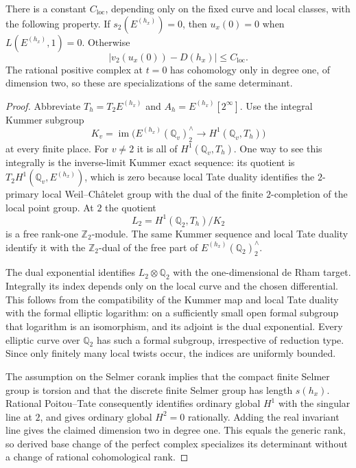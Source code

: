 \begin{proposition}\label{cy:central}
There is a constant $C_{\mathrm{loc}}$, depending only on the fixed curve
and local classes, with the following property.  If $s_2(E^{(h_x)})=0$,
then $u_x(0)=0$ when $L(E^{(h_x)},1)=0$.  Otherwise
\begin{equation}\label{cy:central-formula}
 \bigl|v_2(u_x(0))-D(h_x)\bigr|\leq C_{\mathrm{loc}}.
\end{equation}
The rational positive complex at $t=0$ has cohomology only in degree one,
of dimension two, so these are specializations of the same determinant.
\end{proposition}
\begin{proof}
Abbreviate $T_h=T_2E^{(h_x)}$ and $A_h=E^{(h_x)}[2^\infty]$.
Use the integral Kummer subgroup
\[
 K_v=\operatorname{im}\bigl(E^{(h_x)}(\mathbb Q _v)^{\wedge}_2
                              \longrightarrow H^1(\mathbb Q _v,T_h)\bigr)
\]
at every finite place.  For $v\ne2$ it is all of $H^1(\mathbb Q _v,T_h)$.
One way to see this integrally is the inverse-limit Kummer exact sequence:
its quotient is $T_2H^1(\mathbb Q _v,E^{(h_x)})$, which is zero because
local Tate duality identifies the $2$-primary local Weil--Ch\^atelet group
with the dual of the finite $2$-completion of the local point group.
At $2$ the quotient
\[
 L_2=H^1(\mathbb Q _2,T_h)/K_2
\]
is a free rank-one $\mathbb Z _2$-module.  The same Kummer sequence and
local Tate duality identify it with the $\mathbb Z _2$-dual of the free
part of $E^{(h_x)}(\mathbb Q _2)^{\wedge}_2$.

The dual exponential identifies $L_2\otimes\mathbb Q _2$ with the
one-dimensional de Rham target.  Integrally its index depends only on
the local curve and the chosen differential.  This follows from the
compatibility of the Kummer map and local Tate duality with the formal
elliptic logarithm: on a sufficiently small open formal subgroup that
logarithm is an isomorphism, and its adjoint is the dual exponential.
Every elliptic curve over $\mathbb Q _2$ has such a formal subgroup,
irrespective of reduction type.  Since only finitely many local twists
occur, the indices are uniformly bounded.

The assumption on the Selmer corank implies that the compact finite
Selmer group is torsion and that the discrete finite Selmer group has
length $s(h_x)$.  Rational Poitou--Tate consequently identifies ordinary
global $H^1$ with the singular line at $2$, and gives ordinary global
$H^2=0$ rationally.  Adding the real invariant line gives the claimed
dimension two in degree one.  This equals the generic rank, so derived
base change of the perfect complex specializes its determinant without
a change of rational cohomological rank.


\end{proof}
